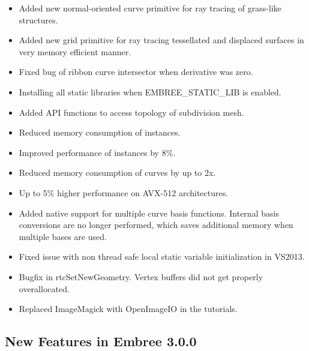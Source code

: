 \begin{itemize}
\tightlist
\item
  Added new normal-oriented curve primitive for ray tracing of
  grass-like structures.
\item
  Added new grid primitive for ray tracing tessellated and displaced
  surfaces in very memory efficient manner.
\item
  Fixed bug of ribbon curve intersector when derivative was zero.
\item
  Installing all static libraries when EMBREE\_STATIC\_LIB is enabled.
\item
  Added API functions to access topology of subdivision mesh.
\item
  Reduced memory consumption of instances.
\item
  Improved performance of instances by 8\%.
\item
  Reduced memory consumption of curves by up to 2x.
\item
  Up to 5\% higher performance on AVX-512 architectures.
\item
  Added native support for multiple curve basis functions. Internal
  basis conversions are no longer performed, which saves additional
  memory when multiple bases are used.
\item
  Fixed issue with non thread safe local static variable initialization
  in VS2013.
\item
  Bugfix in rtcSetNewGeometry. Vertex buffers did not get properly
  overallocated.
\item
  Replaced ImageMagick with OpenImageIO in the tutorials.
\end{itemize}

\subsection{New Features in Embree
3.0.0}\label{new-features-in-embree-3.0.0}

